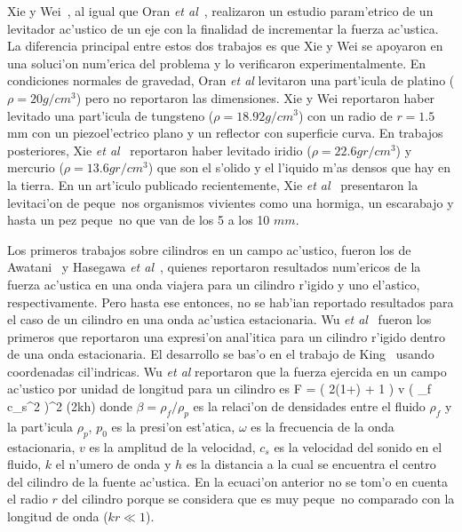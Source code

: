 Xie y Wei~\cite{xie01}, al igual que Oran {\it et al}~\cite{oran80}, realizaron un estudio param'etrico de un levitador
ac'ustico de un eje  con la finalidad de incrementar la fuerza ac'ustica. La diferencia principal entre estos
dos trabajos es que Xie y Wei se apoyaron en una soluci'on num'erica del problema y lo verificaron 
experimentalmente. En condiciones normales de gravedad, Oran {\it et al} levitaron una part'icula de
platino ($\rho=20 g/cm^3$) pero no reportaron las dimensiones. Xie y Wei reportaron haber 
levitado una part'icula de tungsteno ($\rho=18.92 g/cm^3$) con un radio de $r=1.5$mm con un piezoel'ectrico
plano y un reflector con superficie curva.  En trabajos posteriores, Xie {\it et al}~\cite{xie02,xie02c} reportaron
haber levitado iridio ($\rho=22.6 gr/cm^3$) y mercurio ($\rho=13.6 gr/cm^3$) que son el s'olido  y el l'iquido m'as
densos   que hay en la tierra. En un art'iculo publicado recientemente, 
Xie {\it et al}~\cite{xie06}  presentaron la levitaci'on de peque~nos organismos vivientes como una
hormiga, un escarabajo y hasta un pez peque~no que van de los 5 a los 10 $mm$. 
 

Los primeros trabajos sobre cilindros en un campo ac'ustico, fueron los de
Awatani~\cite{awatani55} y Hasegawa {\it et al}~\cite{hasegawa88}, quienes  reportaron  resultados
num'ericos de la fuerza ac'ustica en una onda viajera para un cilindro r'igido y uno el'astico, respectivamente. Pero
hasta ese entonces, no se hab'ian reportado resultados para el caso de un cilindro en una onda ac'ustica estacionaria.
Wu {\it et al}~\cite{wu90} fueron los primeros que reportaron una expresi'on anal'itica para un cilindro r'igido dentro de una
onda estacionaria. El desarrollo se bas'o en el trabajo de King~\cite{king34} usando coordenadas cil'indricas. 
Wu {\it et al} reportaron que la fuerza ejercida en un campo ac'ustico por unidad de longitud  para un cilindro es
\BE\label{eq:force-wu}
F = \left(  {2(1+\beta)} + 1 \right) v \omega \left(  {\rho_f c_s^2} \right)^2 \sin (2kh)
\EE
donde $\beta=\rho_f/\rho_p$ es la relaci'on de densidades entre el fluido $\rho_f$ y la part'icula $\rho_p$, $p_0$ es la
presi'on est'atica, $\omega$ es la frecuencia de la onda estacionaria, $v$ es la amplitud de la velocidad, $c_s$ es la
velocidad del sonido en el fluido, $k$ el n'umero de onda y $h$ es la distancia a la cual se encuentra el centro del 
cilindro de la fuente ac'ustica. En la ecuaci'on anterior no se tom'o en cuenta el
radio $r$ del cilindro porque se considera que es muy peque~no comparado con la longitud de onda ($kr \ll 1$).

